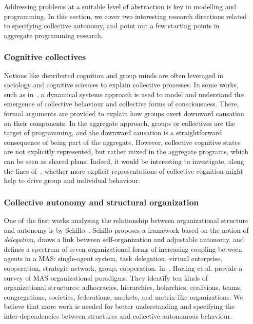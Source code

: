 Addressing problems at a suitable level of abstraction
 is key in modelling and programming.
%
In this section, we cover two interesting research directions 
 related to specifying collective autonomy,
 and point out a few starting points in aggregate programming research.

\subsubsection{Cognitive collectives}
%
Notions like distributed cognition 
 and group minds
 are often leveraged in sociology and cognitive sciences
 to explain collective processes.
%
In some works, such as in~\cite{DBLP:journals/mima/Palermos16},
 a dynamical systems approach is used
 to model and understand the emergence 
 of collective behaviour and collective forms of consciousness.
%
There, formal arguments are provided to 
 explain how groups exert downward causation 
 on their components.
%
In the aggregate approach,
 groups or collectives
 are the target of programming,
 and the downward causation 
 is a straightforward consequence 
 of being part of the aggregate.
%
However, collective cognitive states are not explicitly represented,
 but rather mixed in the aggregate programs, which can be seen as shared plans.
%
Indeed, it would be interesting to investigate,
 along the lines of~\cite{viroli2017ijaose-aggregate-plans},
 whether more explicit representations 
 of collective cognition
 might help to drive group and individual behaviour.


\subsubsection{Collective autonomy and structural organization}

One of the first works analysing the relationship between organizational structure
 and autonomy 
 is by Schillo~\cite{DBLP:journals/connection/Schillo02}.
%
Schillo proposes a framework based on the notion of \emph{delegation},
draws a link between self-organization and adjustable autonomy,
and defines a spectrum of seven organizational forms of increasing coupling between agents in a MAS: 
 single-agent system,
 task delegation,
 virtual enterprise,
 cooperation,
 strategic network,
 group,
 cooperation.
%
In~\cite{DBLP:journals/ker/HorlingL04},
 Horling et al. 
 provide a survey of MAS organizational paradigms.
%
They identify ten kinds of organizational structures:
 adhocracies, hierarchies, holarchies, coalitions, teams, congregations, societies, federations, markets, and matrix-like organizations.
%
We believe that more work is needed for better understanding and specifying the inter-dependencies between structures
 and collective autonomous behaviour.

